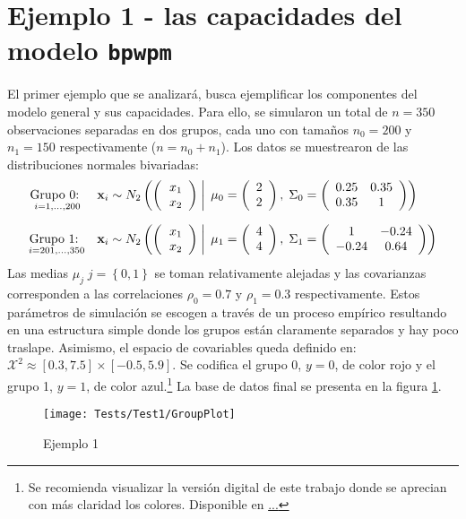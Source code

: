 \documentclass[../Main/Main.tex]{subfiles}
\begin{document}
\section{Ejemplo 1 - las capacidades del modelo \texttt{bpwpm} } \label{sec:T1}
El primer ejemplo que se analizará, busca ejemplificar los componentes del modelo general y sus capacidades. Para ello, se simularon un total de $n = 350$ observaciones separadas en dos grupos, cada uno con tamaños $n_{0} = 200$ y  $n_{1} = 150$ respectivamente ($n = n_0 + n_1$). Los datos se muestrearon de las distribuciones normales bivariadas:
\begin{align*}
\underset{i = 1,\ldots,200}{\text{Grupo 0: }} \quad 
&\xsn_i \sim \normbivar{2}{2}{0.25}{0.35}{1}{0} \\[6pt]
\underset{i = 201,\ldots,350}{\text{Grupo 1: }} \quad 
&\xsn_i \sim \normbivar{4}{4}{1}{-0.24}{0.64}{1} 
\end{align*}
Las medias $\mu_j \; j = \left\{0,1\right\}$ se toman relativamente alejadas y las covarianzas corresponden a las correlaciones $\rho_0 = 0.7$ y $\rho_1 = 0.3$ respectivamente. Estos parámetros de simulación se escogen a través de un proceso empírico resultando en una estructura simple donde los grupos están claramente separados y hay poco traslape. Asimismo, el espacio de covariables queda definido en: $\mathcal{X}^2 \approx [0.3,7.5]\times[-0.5,5.9]$. Se codifica el grupo 0, $y = 0$, de color rojo y el grupo 1, $y = 1$, de color azul.\footnote{Se recomienda visualizar la versión digital de este trabajo donde se aprecian con más claridad los colores. Disponible en \url{...}} La base de datos final se presenta en la figura \ref{fig:Test1Plot}.
\begin{figure}[h]
  \centering
      \texttt{[image: Tests/Test1/GroupPlot]}
  \caption{Ejemplo 1}
 \label{fig:Test1Plot}
\end{figure}
\end{document}
